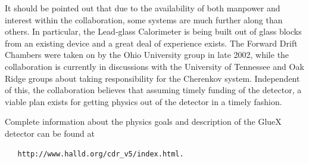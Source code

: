 \hspace{1cm}
It should be pointed out that due to the availability of both manpower
and interest within the collaboration, some systems are much further
along than others. In particular, the Lead-glass Calorimeter is
being built out of glass blocks from an existing device and a great
deal of experience exists. The Forward Drift Chambers were taken on
by the Ohio University group in late 2002, while the collaboration is
currently in discussions with the University of Tennessee and Oak
Ridge groups about taking responsibility for the Cherenkov system.
Independent of this, the collaboration believes that assuming timely
funding of the detector, a viable plan exists for getting physics 
out of the detector in a timely fashion. 

\bigskip
Complete information about the physics goals and description of the GlueX detector
can be found at
\begin{verbatim} 
   http://www.halld.org/cdr_v5/index.html.
\end{verbatim}


